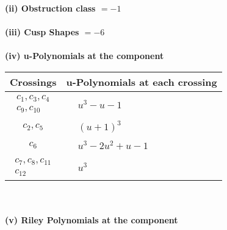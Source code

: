 \documentclass[1p]{elsarticle_modified}
\theoremstyle{definition}
\begin{document}
\flushleft \textbf{(ii) Obstruction class $= -1$}\\~\\
\flushleft \textbf{(iii) Cusp Shapes $= -6$}\\~\\
\newpage\renewcommand{\arraystretch}{1}
\flushleft \textbf{(iv) u-Polynomials at the component}\newline \\
\begin{tabular}{m{50pt}|m{274pt}}
Crossings & \hspace{64pt}u-Polynomials at each crossing \\
\hline $$\begin{aligned}c_{1},c_{3},c_{4}\\c_{9},c_{10}\end{aligned}$$&$\begin{aligned}
&u^3- u-1
\end{aligned}$\\
\hline $$\begin{aligned}c_{2},c_{5}\end{aligned}$$&$\begin{aligned}
&(u+1)^3
\end{aligned}$\\
\hline $$\begin{aligned}c_{6}\end{aligned}$$&$\begin{aligned}
&u^3-2 u^2+u-1
\end{aligned}$\\
\hline $$\begin{aligned}c_{7},c_{8},c_{11}\\c_{12}\end{aligned}$$&$\begin{aligned}
&u^3
\end{aligned}$\\
\hline
\end{tabular}\\~\\
\newpage\renewcommand{\arraystretch}{1}
\flushleft \textbf{(v) Riley Polynomials at the component}\newline \\
\end{document}
